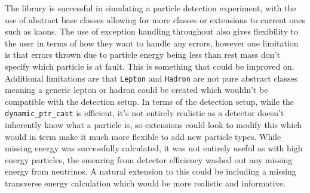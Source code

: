 \documentclass[12pt]{report}
\begin{document}
The library is successful in simulating a particle detection experiment, with the use of abstract base classes allowing for more classes or extensions to current ones such as kaons. The use of exception handling throughout also gives flexibility to the user in terms of how they want to handle any errors, however one limitation is that errors thrown due to particle energy being less than rest mass don't specify which particle is at fault. This is something that could be improved on. Additional limitations are that \texttt{Lepton} and \texttt{Hadron} are not pure abstract classes meaning a generic lepton or hadron could be created which wouldn't be compatible with the detection setup. In terms of the detection setup, while the \texttt{dynamic\_ptr\_cast} is efficient, it's  not entirely realistic as a detector doesn't inherently know what a particle is, so extensions could look to modify this which would in term make it much more flexible to add new particle types. While missing energy was successfully calculated, it was not entirely useful as with high energy particles, the smearing from detector efficiency washed out any missing energy from neutrinos. A natural extension to this could be including a missing transverse energy calculation which would be more realistic and informative.

\vspace*{\fill}

 
\end{document}

